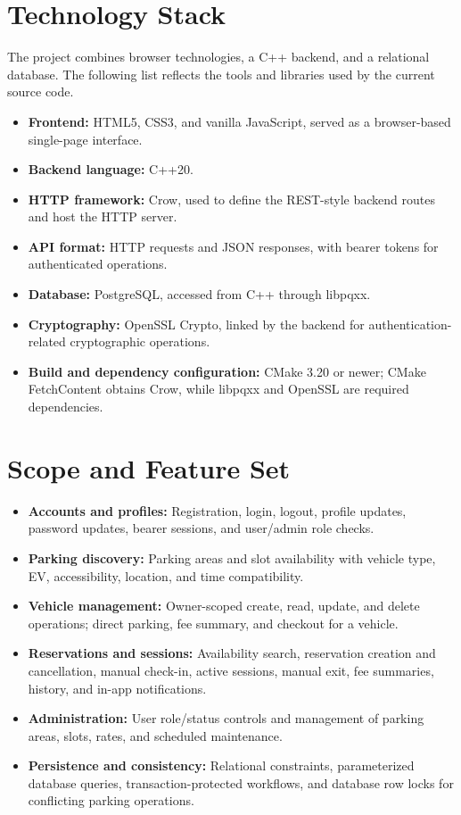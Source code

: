 \documentclass[12pt,a4paper]{article}
\begin{document}
\section{Technology Stack}
The project combines browser technologies, a C++ backend, and a relational
database. The following list reflects the tools and libraries used by the
current source code.

\begin{itemize}
  \item \textbf{Frontend:} HTML5, CSS3, and vanilla JavaScript, served as a
  browser-based single-page interface.
  \item \textbf{Backend language:} C++20.
  \item \textbf{HTTP framework:} Crow, used to define the REST-style backend
  routes and host the HTTP server.
  \item \textbf{API format:} HTTP requests and JSON responses, with bearer
  tokens for authenticated operations.
  \item \textbf{Database:} PostgreSQL, accessed from C++ through libpqxx.
  \item \textbf{Cryptography:} OpenSSL Crypto, linked by the backend for
  authentication-related cryptographic operations.
  \item \textbf{Build and dependency configuration:} CMake 3.20 or newer;
  CMake FetchContent obtains Crow, while libpqxx and OpenSSL are required
  dependencies.
\end{itemize}

\section{Scope and Feature Set}
\begin{itemize}
  \item \textbf{Accounts and profiles:} Registration, login, logout, profile
  updates, password updates, bearer sessions, and user/admin role checks.
  \item \textbf{Parking discovery:} Parking areas and slot availability with
  vehicle type, EV, accessibility, location, and time compatibility.
  \item \textbf{Vehicle management:} Owner-scoped create, read, update, and
  delete operations; direct parking, fee summary, and checkout for a vehicle.
  \item \textbf{Reservations and sessions:} Availability search, reservation
  creation and cancellation, manual check-in, active sessions, manual exit,
  fee summaries, history, and in-app notifications.
  \item \textbf{Administration:} User role/status controls and management of
  parking areas, slots, rates, and scheduled maintenance.
  \item \textbf{Persistence and consistency:} Relational constraints,
  parameterized database queries, transaction-protected workflows, and
  database row locks for conflicting parking operations.
\end{itemize}
\end{document}
